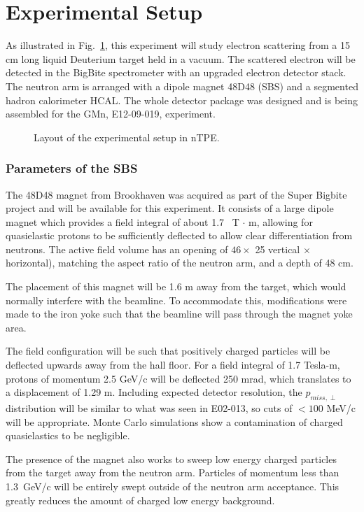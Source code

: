 \section{Experimental Setup}
%
\label{sec:expsetup}

As illustrated in Fig.~\ref{pic:expsetup}, this experiment will study electron scattering from a 15 cm long 
liquid Deuterium target held in a vacuum.
The scattered electron will be detected in the BigBite spectrometer with an upgraded electron detector stack. 
The neutron arm is arranged with a dipole magnet 48D48 (SBS) and a segmented hadron calorimeter HCAL.  
The whole detector package was designed and is being assembled for the GMn, E12-09-019, experiment. 

\begin{figure}[bh]
	\caption{Layout of the experimental setup in nTPE.}	
\label{pic:expsetup}
\end{figure}

\subsubsection{Parameters of the SBS}

The 48D48 magnet from Brookhaven was acquired as part of the Super Bigbite project and will be available for this experiment.  
It consists of a large dipole magnet which provides a field integral of about 1.7~ T $\cdot$ m, allowing for quasielastic 
protons to be sufficiently deflected to allow clear differentiation from neutrons.  
The active field volume has an opening of $46 \times$ 25 vertical $\times$ horizontal), 
matching the aspect ratio of the neutron arm, and a depth of 48 cm.

The placement of this magnet will be 1.6 m away from the target, which would normally interfere with the beamline.  
To accommodate this, modifications were made to the iron yoke such that the beamline will pass through the magnet yoke area.

The field configuration will be such that positively charged particles will be deflected upwards away from the hall floor.  
For a field integral of 1.7 Tesla-m, protons of momentum 2.5 GeV/c will be deflected 250 mrad,
 which translates to a displacement of 1.29 m.  
 Including expected detector resolution,  the $p_{miss,\perp}$ distribution will be similar to 
 what was seen in E02-013, so cuts of  $< 100$ MeV/c will be appropriate.  
Monte Carlo simulations show a contamination of charged quasielastics to be negligible.

The presence of the magnet also works to sweep low energy charged particles from the target away from the neutron arm.  
Particles of momentum less than 1.3~{GeV/c} will be entirely swept outside of the neutron arm acceptance.  
This greatly reduces the amount of charged low energy background.
%

